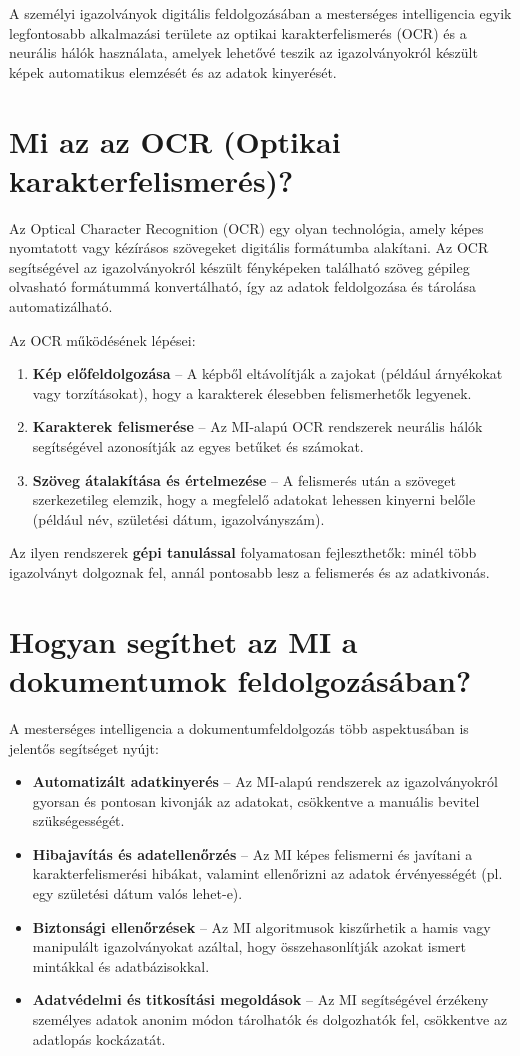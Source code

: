 \documentclass[
]{thesis-ekf}
\theoremstyle{definition}
\theoremstyle{remark}
\begin{document}
	A személyi igazolványok digitális feldolgozásában a mesterséges intelligencia egyik legfontosabb alkalmazási területe az optikai karakterfelismerés (OCR) és a neurális hálók használata, amelyek lehetővé teszik az igazolványokról készült képek automatikus elemzését és az adatok kinyerését.
	
	\section{Mi az az OCR (Optikai karakterfelismerés)?}
	Az Optical Character Recognition (OCR) egy olyan technológia, amely képes nyomtatott vagy kézírásos szövegeket digitális formátumba alakítani. Az OCR segítségével az igazolványokról készült fényképeken található szöveg gépileg olvasható formátummá konvertálható, így az adatok feldolgozása és tárolása automatizálható.
	
	Az OCR működésének lépései:
	\begin{enumerate}
		\item \textbf{Kép előfeldolgozása} -- A képből eltávolítják a zajokat (például árnyékokat vagy torzításokat), hogy a karakterek élesebben felismerhetők legyenek.
		\item \textbf{Karakterek felismerése} -- Az MI-alapú OCR rendszerek neurális hálók segítségével azonosítják az egyes betűket és számokat.
		\item \textbf{Szöveg átalakítása és értelmezése} -- A felismerés után a szöveget szerkezetileg elemzik, hogy a megfelelő adatokat lehessen kinyerni belőle (például név, születési dátum, igazolványszám).
	\end{enumerate}
	
	Az ilyen rendszerek \textbf{gépi tanulással} folyamatosan fejleszthetők: minél több igazolványt dolgoznak fel, annál pontosabb lesz a felismerés és az adatkivonás.
	\section{Hogyan segíthet az MI a dokumentumok feldolgozásában?}
	A mesterséges intelligencia a dokumentumfeldolgozás több aspektusában is jelentős segítséget nyújt:
	\begin{itemize}
		\item \textbf{Automatizált adatkinyerés} -- Az MI-alapú rendszerek az igazolványokról gyorsan és pontosan kivonják az adatokat, csökkentve a manuális bevitel szükségességét.
		\item \textbf{Hibajavítás és adatellenőrzés} -- Az MI képes felismerni és javítani a karakterfelismerési hibákat, valamint ellenőrizni az adatok érvényességét (pl. egy születési dátum valós lehet-e).
		\item \textbf{Biztonsági ellenőrzések} -- Az MI algoritmusok kiszűrhetik a hamis vagy manipulált igazolványokat azáltal, hogy összehasonlítják azokat ismert mintákkal és adatbázisokkal.
		\item \textbf{Adatvédelmi és titkosítási megoldások} -- Az MI segítségével érzékeny személyes adatok anonim módon tárolhatók és dolgozhatók fel, csökkentve az adatlopás kockázatát.
	\end{itemize}
\end{document}
